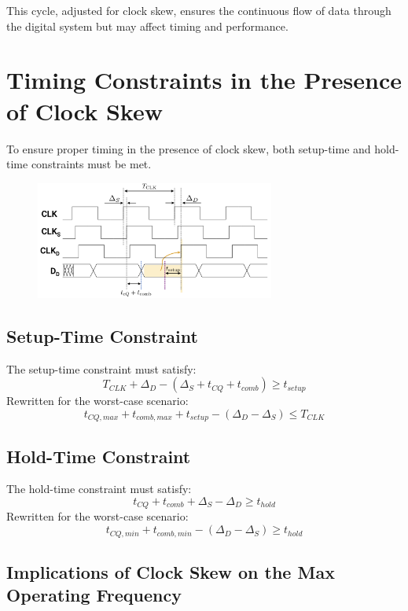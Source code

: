 \documentclass[12pt,openany]{book}
\begin{document}
This cycle, adjusted for clock skew, ensures the continuous flow of data through the digital system but may affect timing and performance.


\section{Timing Constraints in the Presence of Clock Skew}

To ensure proper timing in the presence of clock skew, both setup-time and hold-time constraints must be met.

\begin{figure}[htp]
    \centering
    \includegraphics[width=0.7\textwidth]{circuits/15.6.png}
\end{figure}

\subsection{Setup-Time Constraint}
The setup-time constraint must satisfy:
\[
T_{CLK} + \Delta_D - (\Delta_S + t_{CQ} + t_{comb}) \geq t_{setup}
\]
Rewritten for the worst-case scenario:
\[
t_{CQ,max} + t_{comb,max} + t_{setup} - (\Delta_D - \Delta_S) \leq T_{CLK}
\]

\subsection{Hold-Time Constraint}
The hold-time constraint must satisfy:
\[
t_{CQ} + t_{comb} + \Delta_S - \Delta_D \geq t_{hold}
\]
Rewritten for the worst-case scenario:
\[
t_{CQ,min} + t_{comb,min} - (\Delta_D - \Delta_S) \geq t_{hold}
\]

\newpage
\subsection{Implications of Clock Skew on the Max Operating Frequency}
\end{document}
